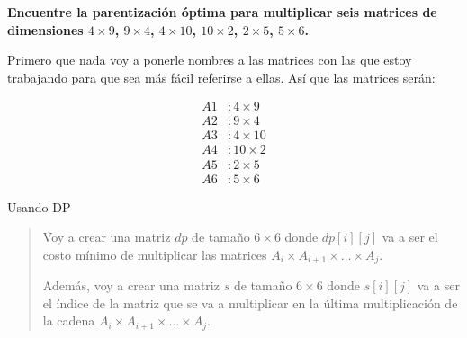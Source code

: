 \textbf{Encuentre la parentización óptima para multiplicar seis matrices de dimensiones $4 \times 9$, $9 \times 4$, $4 \times 10$, $10 \times 2$, $2 \times 5$, $5 \times 6$.}\vspace{.2cm}

Primero que nada voy a ponerle nombres a las matrices con las que estoy trabajando para que sea más fácil referirse a ellas. Así que las matrices serán:

\begin{align*}
    A1 & : 4 \times 9 \\
    A2 & : 9 \times 4 \\
    A3 & : 4 \times 10 \\
    A4 & : 10 \times 2 \\
    A5 & : 2 \times 5 \\
    A6 & : 5 \times 6   
\end{align*}

\textcolor{bibi}{Usando DP}
\begin{quote}
    Voy a crear una matriz $dp$ de tamaño $6 \times 6$ donde $dp[i][j]$ va a ser el costo mínimo de multiplicar las matrices $A_i \times A_{i+1} \times \ldots \times A_j$. \vspace{.2cm}

    Además, voy a crear una matriz $s$ de tamaño $6 \times 6$ donde $s[i][j]$ va a ser el índice de la matriz que se va a multiplicar en la última multiplicación de la cadena $A_i \times A_{i+1} \times \ldots \times A_j$. \vspace{.2cm}
\end{quote}

\newpage